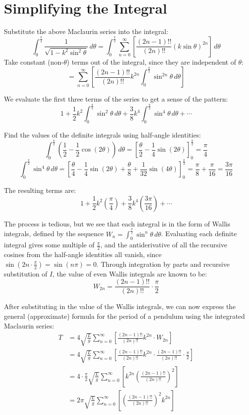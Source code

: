 \documentclass[12pt]{article}
\begin{document}
\section{Simplifying the Integral}

Substitute the above Maclaurin series into the integral:
\[
  \int_{0}^{\frac{\pi}{2}} \frac{1}{\sqrt{1 - k^2
  \sin^2 \theta}} \, d\theta = \int_{0}^{\frac{\pi}{2}}
  \sum_{n=0}^{\infty} \left[\frac{ (2n-1)!!}{(2n)!!}
  {\left(k\sin\theta\right)}^{2n}\right] \, d\theta
\]
Take constant (non-$\theta$) terms out of the integral, since they
are independent of $\theta$:
\[
  = \sum_{n=0}^{\infty} \left[\frac{ (2n-1)!!}{(2n)!!} k^{2n}
  \int_{0}^{\frac{\pi}{2}} \sin^{2n} \theta \, d\theta\right]
\]

We evaluate the first three terms of the series to get a sense of the pattern:
\[
  1 + \frac{1}{2}k^2\int_{0}^{\frac{\pi}{2}} \sin^2 \theta \, d\theta
  + \frac{3}{8}k^4\int_{0}^{\frac{\pi}{2}} \sin^4 \theta \, d\theta + \cdots
\]

Find the values of the definite integrals using half-angle identities:
\[
  \int_{0}^{\frac{\pi}{2}} \left(\frac{1}{2} -
  \frac{1}{2}\cos(2\theta)\right) \, d\theta = \left[\frac{\theta}{2}
  - \frac{1}{4}\sin(2\theta)\right]_{0}^{\frac{\pi}{2}} = \frac{\pi}{4}
\]
\[
  \int_{0}^{\frac{\pi}{2}} \sin^4 \theta \, d\theta =
  \left[\frac{\theta}{4} - \frac{1}{4}\sin(2\theta) +
    \frac{\theta}{8} +
  \frac{1}{32}\sin(4\theta)\right]_{0}^{\frac{\pi}{2}} =
  \frac{\pi}{8} + \frac{\pi}{16} = \frac{3\pi}{16}
\]

The resulting terms are:
\[
  1 + \frac{1}{2}k^2\left(\frac{\pi}{4}\right) +
  \frac{3}{8}k^4\left(\frac{3\pi}{16}\right) + \cdots
\]

The process is tedious, but we see that each integral is in the form
of Wallis integrals, defined by the sequence $W_n =
\int_{0}^{\frac{\pi}{2}} \sin^n \theta \, d\theta$. Evaluating each
definite integral gives some multiple of $\frac{\pi}{2}$, and the
antiderivative of all the recursive cosines from the half-angle
identities all vanish, since $\sin(2n \cdot \frac{\pi}{2}) =
\sin(n\pi) = 0$. Through integration by parts and recursive
substitution of $I$, the value of even Wallis integrals are known to be:
\[
  W_{2n} = \frac{(2n-1)!!}{(2n)!!} \cdot \frac{\pi}{2}
\]

After substituting in the value of the Wallis integrals, we can now express the general (approximate) formula for the period of a pendulum using the integrated Maclaurin series:
\begin{align*}
  T &= 4 \sqrt{\frac{L}{g}} \sum_{n=0}^{\infty} \left[\frac{ (2n-1)!!}{(2n)!!} k^{2n} \cdot W_{2n}\right] \\
  &= 4 \sqrt{\frac{L}{g}} \sum_{n=0}^{\infty} \left[\frac{ (2n-1)!!}{(2n)!!} k^{2n} \cdot \frac{(2n-1)!!}{(2n)!!} \cdot \frac{\pi}{2}\right] \\
  &= 4 \cdot \frac{\pi}{2} \sqrt{\frac{L}{g}} \sum_{n=0}^{\infty} \left[ k^{2n} \left(\frac{(2n-1)!!}{(2n)!!}\right)^2 \right] \\
  &= 2\pi \sqrt{\frac{L}{g}} \sum_{n=0}^{\infty} \left[ \left(\frac{(2n-1)!!}{(2n)!!}\right)^2 k^{2n} \right]
\end{align*}
\end{document}
